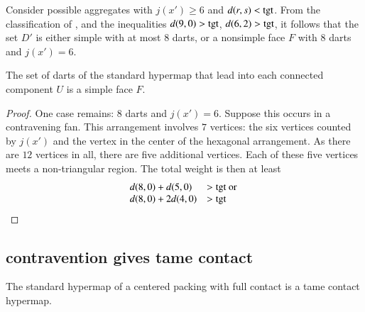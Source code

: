 Consider possible aggregates with $j(x')\ge 6$ and $d(r,s)<{\operatorname{tgt}}$.
From the classification of \cite[p.~126,~Fig.~12.1]{Hales:2006:DCG}, and the inequalities $d(9,0) > {\operatorname{tgt}}$, $d(6,2) > {\operatorname{tgt}}$, it follows that the set $D'$
is either simple with at most $8$ darts, or a nonsimple face $F$ with $8$ darts and $j(x')=6$.

\begin{lemma}\label{lemma:simple} The set of darts of the standard hypermap that lead into each connected component $U$ is a simple face $F$.
\end{lemma}
%
%

\begin{proof} One  case remains: $8$ darts and $j(x')=6$.  Suppose this occurs in a contravening fan.  This arrangement involves $7$ vertices: the six vertices counted by $j(x')$ and the vertex in the center of the hexagonal arrangement.  As there are $12$ vertices in all, there are five additional vertices.  Each of these five vertices meets a non-triangular region.  The total weight is then at least
$$
\begin{array}{lll}
d(8,0) + d(5,0) &> {\operatorname{tgt}}\hbox{ or }\\
d(8,0) + 2 d(4,0) &> {\operatorname{tgt}}\\
\end{array}
$$
\end{proof}
%
%








\subsection{contravention gives tame contact}

\begin{theorem} The standard hypermap of a centered packing with full contact is a tame contact hypermap.
\end{theorem}
%
%
%
%

